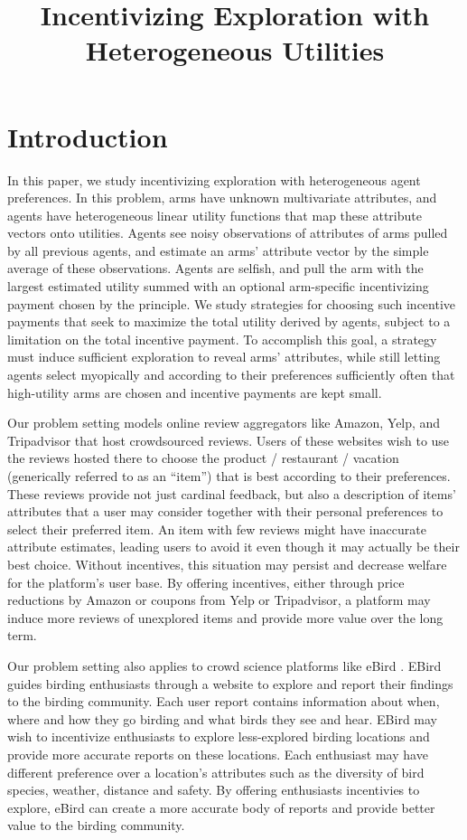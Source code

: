 \documentclass{article}
\title{Incentivizing Exploration with Heterogeneous Utilities}
\begin{document}
\maketitle


\section{Introduction}
In this paper, we study incentivizing exploration with heterogeneous agent preferences.
In this problem,   
arms have unknown multivariate attributes, and agents have heterogeneous linear utility functions that map these attribute vectors onto utilities. Agents see noisy observations of attributes of arms pulled by all previous agents, and estimate an arms' attribute vector by the simple average of these observations.  Agents are selfish, and pull the arm with the largest estimated utility summed with an optional arm-specific incentivizing payment chosen by the principle.
We study strategies for choosing such incentive payments that seek to maximize the total utility derived by agents, subject to a limitation on the total incentive payment.  To accomplish this goal, a strategy must induce sufficient exploration to reveal arms' attributes, while still letting agents select myopically and according to their preferences sufficiently often that high-utility arms are chosen and incentive payments are kept small.

Our problem setting models online review aggregators like Amazon, Yelp, and Tripadvisor that host crowdsourced reviews.  Users of these websites wish to use the reviews hosted there to choose the product / restaurant / vacation (generically referred to as an ``item'') that is best according to their preferences.  These reviews provide not just cardinal feedback, but also a description of items' attributes that a user may consider together with their personal preferences to select their preferred item.  An item with few reviews might have inaccurate attribute estimates, leading users to avoid it even though it may actually be their best choice.  Without incentives, this situation may persist and decrease welfare for the platform's user base.  By offering incentives, either through price reductions by Amazon or coupons from Yelp or Tripadvisor, a platform may induce more reviews of unexplored items and provide more value over the long term.

Our problem setting also applies to crowd science platforms like eBird \cite{frazier2014incentivizing, sullivan2009ebird}. EBird guides birding enthusiasts through a website to explore and report their findings to the birding community. Each user report contains information about when, where and how they go birding and what birds they see and hear. EBird may wish to incentivize enthusiasts to explore less-explored birding locations and provide more accurate reports on these locations. Each enthusiast may have different preference over a location's attributes such as the diversity of bird species, weather, distance and safety. By offering enthusiasts incentivies to explore, eBird can create a more accurate body of reports and provide better value to the birding community.
\end{document}
